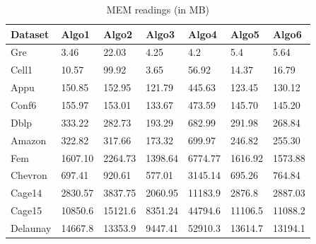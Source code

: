 

\begin{table}[th]
\begin{center}
    \begin{tabular}{| l | l | l | l | l | l | l |}
    \hline
	Dataset & Algo1 & Algo2 & Algo3 & Algo4 & Algo5 & Algo6\\ \hline
    \hline
	Gre & \cellcolor{blue!25}3.46 & 22.03 & 4.25 & 4.2 & 5.4 & 5.64 \\ \hline
	Cell1 & 10.57 & 99.92 & \cellcolor{blue!25}3.65 & 56.92 & 14.37 & 16.79\\ \hline
	Appu & 150.85 & 152.95 & \cellcolor{blue!25}121.79 & 445.63 & 123.45 & 130.12\\ \hline
	Conf6 & 155.97 & 153.01 & \cellcolor{blue!25}133.67 & 473.59 & 145.70 & 145.20\\ \hline
	Dblp & 333.22 & 282.73 & \cellcolor{blue!25}193.29 & 682.99 & 291.98 & 268.84\\ \hline
	Amazon & 322.82 & 317.66 & \cellcolor{blue!25}173.32 & 699.97 & 246.82 & 255.30\\ \hline
	Fem & 1607.10 & 2264.73 & \cellcolor{blue!25}1398.64 & 6774.77 & 1616.92 & 1573.88\\ \hline
	Chevron & 697.41 & 920.61 & \cellcolor{blue!25}577.01 & 3145.14 & 695.26 & 764.84\\ \hline
	Cage14 & 2830.57 & 3837.75 & \cellcolor{blue!25}2060.95 & 11183.9 & 2876.8 & 2887.03\\ \hline
	Cage15 & 10850.6 & 15121.6 & \cellcolor{blue!25}8351.24 & 44794.6 & 11106.5 & 11088.2\\ \hline
	Delaunay & 14667.8 & 13353.9 & \cellcolor{blue!25}9447.41 & 52910.3 & 13614.7 & 13194.1\\ \hline
    \end{tabular}
\end{center}
\caption{\capfont MEM readings (in MB)}
\label{tab:Table3}
\end{table}




